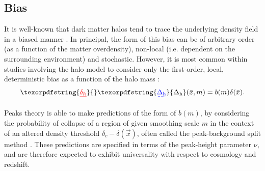 \documentclass[5p,aas_macros]{elsarticle}
\newcommand{\bd}[1]{\textcolor{purple}{\textbf{[BD: #1]}}}
\providecommand{\DIFaddtex}[1]{{\protect\color{blue}\uwave{#1}}} %
\providecommand{\DIFdeltex}[1]{{\protect\color{red}\sout{#1}}}                      %
\providecommand{\DIFaddbegin}{} %
\providecommand{\DIFaddend}{} %
\providecommand{\DIFdelbegin}{} %
\providecommand{\DIFdelend}{} %
\providecommand{\DIFadd}[1]{\texorpdfstring{\DIFaddtex{#1}}{#1}} %
\providecommand{\DIFdel}[1]{\texorpdfstring{\DIFdeltex{#1}}{}} %
\begin{document}
\DIFdelbegin %


\DIFdelend \subsection{Bias}
\label{sec:biastheory}
It is well-known that dark matter halos tend to trace the underlying density field in a biased manner \citep[eg.]{Cole1989}. In principal, the form of this bias can be of arbitrary order (as a function of the matter overdensity), non-local (i.e. dependent on the surrounding environment) and stochastic. However, it is most common within studies involving the halo model to consider only the first-order, local, deterministic bias as a function of the halo mass \citep{Mo1996}: 
\begin{equation}
    \DIFdelbegin \DIFdel{\delta_h}\DIFdelend \DIFaddbegin \DIFadd{\Delta_{\rm h}}\DIFaddend (\bar{x},m) = b(m) \delta(\bar{x}).
\end{equation}
\DIFdelbegin %

\DIFdelend Peaks theory is able to make predictions of the form of $b(m)$, by considering the probability of collapse of a region of given smoothing scale $m$ in the context of an altered density threshold $\delta_c - \delta(\vec{x})$, often called the peak-background split method \citep[for more details, see eg.][]{Bond1991,Zentner2007,Tinker2010,Manera2010}. These predictions are specified in terms of the peak-height parameter $\nu$, and are therefore expected to exhibit universality with respect to cosmology and redshift.
\end{document}
